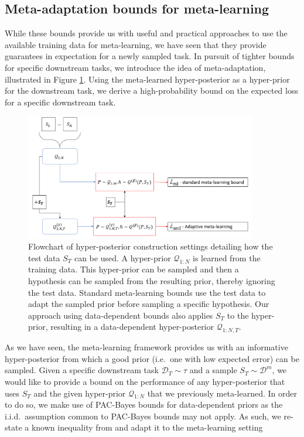 \documentclass{article}
\theoremstyle{definition}
\begin{document}
\subsection{Meta-adaptation bounds for meta-learning} \label{sec:adapt-general}

While these bounds provide us with useful and practical approaches to use the available training data for meta-learning, we have seen that they provide guarantees in expectation for a newly sampled task. In pursuit of tighter bounds for specific downstream tasks, we introduce the idea of meta-adaptation, illustrated in Figure \ref{fig:data_dependant_bound}. Using the meta-learned hyper-posterior as a hyper-prior for the downstream task, we derive a high-probability bound on the expected loss for a specific downstream task. 

\begin{figure}
	\centering
	\includegraphics[width=0.9\textwidth]{data_dependant_adaptation.PNG}
	\caption{Flowchart of hyper-posterior construction settings detailing how the test data $S_T$ can be used. A hyper-prior $\mathcal{Q}_{1:N}$ is learned from the training data. This hyper-prior can be sampled and then a hypothesis can be sampled from the resulting prior, thereby ignoring the test data. Standard meta-learning bounds use the test data to adapt the sampled prior before sampling a specific hypothesis. Our approach using data-dependent bounds also applies $S_T$ to the hyper-prior, resulting in a data-dependent hyper-posterior $\mathcal{Q}_{1:N, T}$. }
	\label{fig:data_dependant_bound}
\end{figure}

As we have seen, the meta-learning framework provides us with an informative hyper-posterior from which a good prior (i.e.\ one with low expected error) can be sampled. Given a specific downstream task $\mathcal{D}_T\sim \tau$ and a sample $S_T\sim \mathcal{D}^m$, we would like to provide a bound on the performance of any hyper-posterior that uses $S_T$ and the given hyper-prior $\mathcal{Q}_{1:N}$ that we previously meta-learned. In order to do so, we make use of PAC-Bayes bounds for data-dependent priors as the i.i.d.\ assumption common to PAC-Bayes bounds may not apply. As such, we re-state a known inequality from \citet{Rivasplata2020} and adapt it to the meta-learning setting
\end{document}
